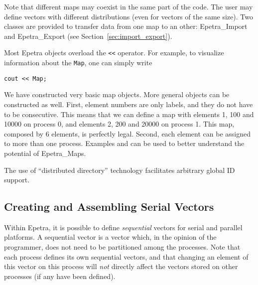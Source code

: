 \smallskip

Note that different maps may coexist in the same part of the code.  The
user may define vectors with different distributions (even for vectors
of the same size).  Two classes are provided to transfer data from one
map to an other: Epetra\_Import and Epetra\_Export (see
Section~\ref{sec:import_export}).

\begin{remark}
Most Epetra objects overload the \verb!<<! operator. For example, to
visualize information about the \verb!Map!, one can simply write
\begin{verbatim}
cout << Map;
\end{verbatim}
\end{remark}

We have constructed very basic map objects.  More general objects can be
constructed as well. First, element numbers are only labels, and they do
not have to be consecutive.  This means that we can define a map with
elements 1, 100 and 10000 on process 0, and elements 2, 200 and 20000 on
process 1. This map, composed by 6 elements, is perfectly legal. Second,
each element can be assigned to more than one process. 
Examples \newline
{} and \newline {} can be used to
better understand the potential of Epetra\_Maps.

\begin{remark}
  The use of ``distributed directory'' technology facilitates arbitrary
  global ID support.
\end{remark}


\subsection{Creating and Assembling Serial Vectors}
\label{sec:serial_vec}

Within Epetra, it is possible to define {\em sequential} vectors for
serial and parallel platforms. A sequential vector is a vector which, in
the opinion of the programmer, does not need to be partitioned among the
processes.  Note that each process defines its own sequential vectors,
and that changing an element of this vector on this process will {\em
  not} directly affect the vectors stored on other processes (if any
have been defined).

